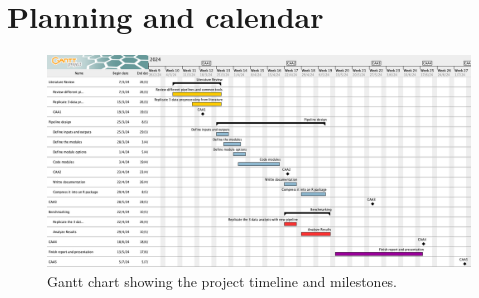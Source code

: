 \documentclass[ENG, BIB]{TFUOC}%
\begin{document}
\section{Planning and calendar}

\begin{figure}[htbp]
    \centering
    \includegraphics[width=\textwidth]{Images/gantt.png}
    \caption{Gantt chart showing the project timeline and milestones.}
    \label{fig:gantt}
\end{figure}

\end{document}
